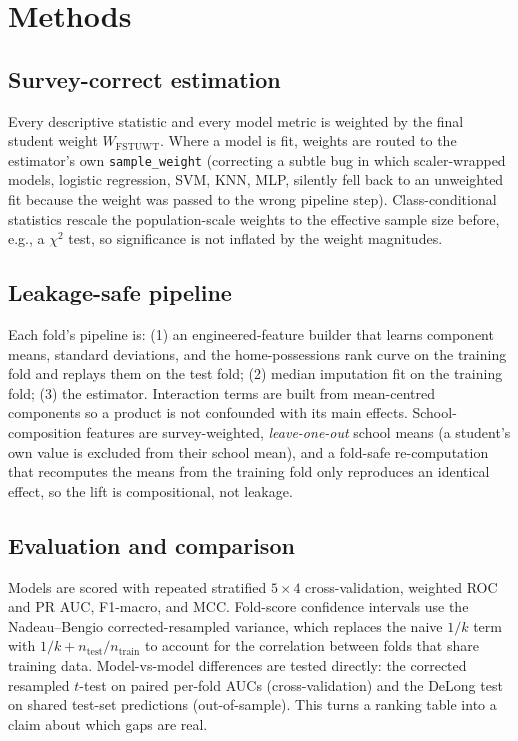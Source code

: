 \section{Methods}
\label{sec:methods}

\subsection{Survey-correct estimation}
Every descriptive statistic and every model metric is weighted by the final student
weight $W_{\mathrm{FSTUWT}}$. Where a model is fit, weights are routed to the
estimator's own \texttt{sample\_weight} (correcting a subtle bug in which
scaler-wrapped models, logistic regression, SVM, KNN, MLP, silently fell back
to an unweighted fit because the weight was passed to the wrong pipeline step).
Class-conditional statistics rescale the population-scale weights to the effective
sample size before, e.g., a $\chi^2$ test, so significance is not inflated by the
weight magnitudes.

\subsection{Leakage-safe pipeline}
Each fold's pipeline is: (1) an engineered-feature builder that learns component
means, standard deviations, and the home-possessions rank curve on the training fold
and replays them on the test fold; (2) median imputation fit on the training fold;
(3) the estimator. Interaction terms are built from mean-centred components so a
product is not confounded with its main effects. School-composition features are
survey-weighted, \emph{leave-one-out} school means (a student's own value is excluded
from their school mean), and a fold-safe re-computation that recomputes the means
from the training fold only reproduces an identical effect, so the lift is
compositional, not leakage.

\subsection{Evaluation and comparison}
Models are scored with repeated stratified $5\times4$ cross-validation, weighted ROC
and PR AUC, F1-macro, and MCC. Fold-score confidence intervals use the
Nadeau--Bengio corrected-resampled variance, which replaces the naive $1/k$ term with
$1/k + n_{\text{test}}/n_{\text{train}}$ to account for the correlation between folds
that share training data. Model-vs-model differences are tested directly: the
corrected resampled $t$-test on paired per-fold AUCs (cross-validation) and the
DeLong test on shared test-set predictions (out-of-sample). This turns a ranking
table into a claim about which gaps are real.

